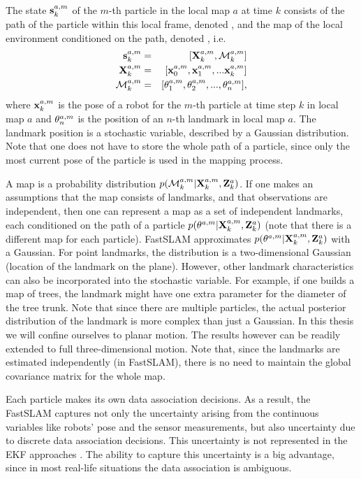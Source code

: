 The state $\s{k}{a}{m}$ of the $m$-th particle in the local map $a$
at time $k$ consists of the path of the particle within this local
frame, denoted , and the map of the local environment
conditioned on the path, denoted , i.e.
\begin{eqnarray}
 \s{k}{a}{m}    &=& [\Xall{k}{a}{m}, \map{k}{a}{m} ]\\
 \Xall{k}{a}{m} &=& [\x{0}{a}{m}, \x{1}{a}{m}, ... \x{k}{a}{m}]\\
 \map{k}{a}{m}  &=& [\mape{a}{m}{1}, \mape{a}{m}{2}, ..., \mape{a}{m}{n}],
\end{eqnarray}
where $\x{k}{a}{m}$ is the pose of a robot for the $m$-th particle at
time step $k$ in local map $a$ and $\mape{a}{m}{n}$ is the position of
an $n$-th landmark in local map $a$. The landmark position is a
stochastic variable, described by a Gaussian distribution. Note that
one does not have to store the whole path of a particle, since only
the most current pose of the particle is used in the mapping process.

A map is a probability distribution
$p(\map{k}{a}{m}|\Xall{k}{a}{m},\Zall{k}{a})$. If one makes an
assumptions that the map consists of landmarks, and that observations
are independent, then one can represent a map as a set of independent
landmarks, each conditioned on the path of a particle
$p(\mape{a}{m}{}|\Xall{k}{a}{m},\Zall{k}{a})$ (note that there is a
different map for each particle). FastSLAM approximates
$p(\mape{a}{m}{}|\Xall{k}{a}{m},\Zall{k}{a})$ with a Gaussian.  For
point landmarks, the distribution is a two-dimensional Gaussian
(location of the landmark on the plane). However, other landmark
characteristics can also be incorporated into the stochastic
variable. For example, if one builds a map of trees, the landmark
might have one extra parameter for the diameter of the tree trunk.
Note that since there are multiple particles, the actual posterior
distribution of the landmark is more complex than just a Gaussian. In
this thesis we will confine ourselves to planar motion. The results
however can be readily extended to full three-dimensional motion. Note
that, since the landmarks are estimated independently (in FastSLAM),
there is no need to maintain the global covariance matrix for the
whole map.

Each particle makes its own data association decisions. As a result,
the FastSLAM captures not only the uncertainty arising from the
continuous variables like robots' pose and the sensor measurements,
but also uncertainty due to discrete data association decisions.  This
uncertainty is not represented in the EKF approaches \cite{ekf_slam}.
The ability to capture this uncertainty is a big advantage, since in
most real-life situations the data association is ambiguous.

